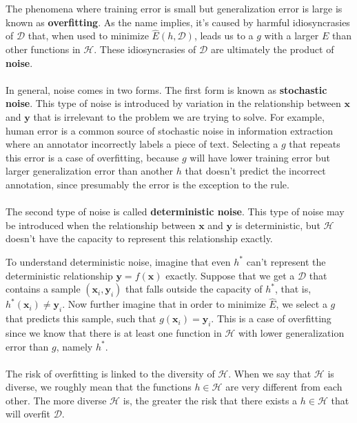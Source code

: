 The phenomena where training error is small but generalization error is large is known as \textbf{overfitting}. As the name implies, it's caused by harmful idiosyncrasies of $\mathcal{D}$ that, when used to minimize $\hat{E}(h, \mathcal{D})$, leads us to a $g$ with a larger $E$ than other functions in $\mathcal{H}$. These idiosyncrasies of $\mathcal{D}$ are ultimately the product of \textbf{noise}.
\\\\
In general, noise comes in two forms. The first form is known as \textbf{stochastic noise}. This type of noise is introduced by variation in the relationship between $\mathbf{x}$ and $\mathbf{y}$ that is irrelevant to the problem we are trying to solve. For example, human error is a common source of stochastic noise in information extraction where an annotator incorrectly labels a piece of text. Selecting a $g$ that repeats this error is a case of overfitting, because $g$ will have lower training error but larger generalization error than another $h$ that doesn't predict the incorrect annotation, since presumably the error is the exception to the rule.
\\\\
The second type of noise is called \textbf{deterministic noise}. This type of noise may be introduced when the relationship between $\mathbf{x}$ and $\mathbf{y}$ is deterministic, but $\mathcal{H}$ doesn't have the capacity to represent this relationship exactly.

To understand deterministic noise, imagine that even $h^*$ can't represent the deterministic relationship $\mathbf{y} = f(\mathbf{x})$ exactly. Suppose that we get a $\mathcal{D}$ that contains a sample $(\mathbf{x}_i, \mathbf{y}_i)$ that falls outside the capacity of $h^*$, that is, $h^*(\mathbf{x}_i) \neq \mathbf{y}_i$. Now further imagine that in order to minimize $\hat{E}$, we select a $g$ that predicts this sample, such that $g(\mathbf{x}_i) = \mathbf{y}_i$. This is a case of overfitting since we know that there is at least one function in $\mathcal{H}$ with lower generalization error than $g$, namely $h^*$.
\\\\
The risk of overfitting is linked to the diversity of $\mathcal{H}$. When we say that $\mathcal{H}$ is diverse, we roughly mean that the functions $h \in \mathcal{H}$ are very different from each other. The more diverse $\mathcal{H}$ is, the greater the risk that there exists a $h \in \mathcal{H}$ that will overfit $\mathcal{D}$.

